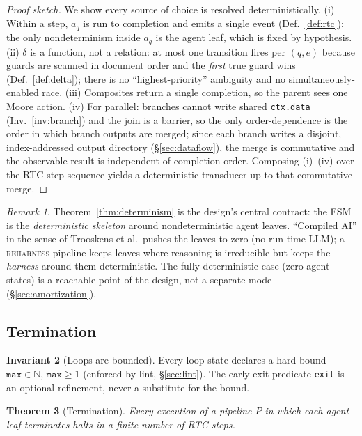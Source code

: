 \documentclass[11pt]{article}
\theoremstyle{plain}
\newtheorem{theorem}{Theorem}[section]
\theoremstyle{definition}
\newtheorem{invariant}[theorem]{Invariant}
\theoremstyle{remark}
\newtheorem{remark}[theorem]{Remark}
\newcommand{\reharness}{\textsc{reharness}}
\newcommand{\code}[1]{\texttt{#1}}
\newcommand{\state}[1]{\textsf{#1}}
\newcommand{\transition}{\ensuremath{\delta}}
\newcommand{\Nat}{\mathbb{N}}
\begin{document}
\begin{proof}[Proof sketch]
We show every source of choice is resolved deterministically.
(i) Within a step, $a_q$ is run to completion and emits a single event
(Def.~\ref{def:rtc}); the only nondeterminism inside $a_q$ is the agent leaf, which
is fixed by hypothesis. (ii) $\transition$ is a function, not a relation: at most
one transition fires per $(q,e)$ because guards are scanned in document order and
the \emph{first} true guard wins (Def.~\ref{def:delta}); there is no
``highest-priority'' ambiguity and no simultaneously-enabled race. (iii) Composites
return a single completion, so the parent sees one Moore action. (iv) For
\state{parallel}: branches cannot write shared \code{ctx.data}
(Inv.~\ref{inv:branch}) and the join is a barrier, so the only order-dependence is
the order in which branch outputs are merged; since each branch writes a disjoint,
index-addressed output directory (\S\ref{sec:dataflow}), the merge is commutative
and the observable result is independent of completion order. Composing
(i)--(iv) over the RTC step sequence yields a deterministic transducer up to that
commutative merge.
\end{proof}

\begin{remark}
Theorem~\ref{thm:determinism} is the design's central contract: the FSM is the
\emph{deterministic skeleton} around nondeterministic agent leaves. ``Compiled AI''
in the sense of Trooskens et al.\ pushes the leaves to zero (no run-time LLM); a
\reharness{} pipeline keeps leaves where reasoning is irreducible but keeps the
\emph{harness} around them deterministic. The fully-deterministic case
(zero agent states) is a reachable point of the design, not a separate mode
(\S\ref{sec:amortization}).
\end{remark}

\subsection{Termination}

\begin{invariant}[Loops are bounded]\label{inv:max}
Every \state{loop} state declares a hard bound $\code{max} \in \Nat$, $\code{max}
\ge 1$ (enforced by lint, \S\ref{sec:lint}). The early-exit predicate \code{exit}
is an optional refinement, never a substitute for the bound.
\end{invariant}

\begin{theorem}[Termination]\label{thm:termination}
Every execution of a pipeline $P$ in which each agent leaf terminates halts in a
finite number of RTC steps.
\end{theorem}
\end{document}
